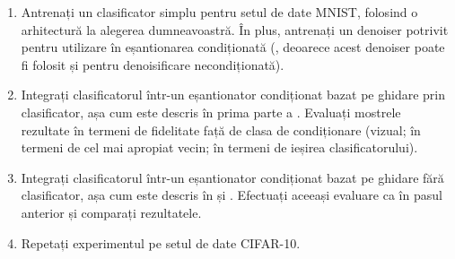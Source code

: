 \documentclass[../../book-main_ro.tex]{subfiles}
\begin{document}
\begin{exercise}
  \begin{enumerate}
    \item Antrenați un clasificator simplu pentru setul de date MNIST, folosind o arhitectură
      la alegerea dumneavoastră. În plus, antrenați un denoiser potrivit pentru utilizare în
      eșantionarea condiționată (,
      deoarece acest denoiser poate fi folosit și pentru denoisificare necondiționată).
    \item Integrați clasificatorul într-un eșantionator condiționat bazat pe
      ghidare prin clasificator, așa cum este descris în prima parte a .
      Evaluați mostrele rezultate în termeni de fidelitate față de
      clasa de condiționare (vizual; în termeni de cel mai apropiat vecin; în termeni de
      ieșirea clasificatorului).
    \item Integrați clasificatorul într-un eșantionator condiționat bazat pe
      ghidare fără clasificator, așa cum este descris în  și
      . Efectuați aceeași
      evaluare ca în pasul anterior și comparați rezultatele.
    \item Repetați experimentul pe setul de date CIFAR-10.
  \end{enumerate}


\end{exercise}
\end{document}
